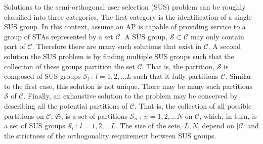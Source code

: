 Solutions to the semi-orthogonal user selection (SUS) problem can be roughly classified into three categories. The first category is the identification of a single SUS group. In this context, assume an AP is capable of providing service to a group of STAs represented by a set $\mathcal{C}$. A SUS group, $\mathcal{S} \subset \mathcal{C}$ may only contain part of $\mathcal{C}$. Therefore there are many such solutions that exist in $\mathcal{C}$. A second solution the SUS problem is by finding multiple SUS groups such that the collection of these groups partition the set $\mathcal{C}$. That is, the partition, $\mathscr{S}$ is composed of SUS groups $\mathcal{S}_l\ :\ l = 1,2,\ldots L$ such that it fully partitions $\mathcal{C}$. Similar to the first case, this solution is not unique. There may be many such partitions $\mathscr{S}$ of $\mathcal{C}$. Finally, an exhaustive solution to the problem may be conceived by describing all the potential partitions of $\mathcal{C}$. That is, the collection of all possible partitions on $\mathcal{C}$, $\mathfrak{S}$, is a set of partitions $\mathscr{S}_n\ : \ n=1,2,\ldots N$ on $\mathcal{C}$, which, in turn, is a set of SUS groups $\mathcal{S}_l \ :\ l = 1,2,\ldots L$. The size of the sets, $L,N$, depend on $\vert \mathcal{C}\vert$ and the strictness of the orthogonality requirement between SUS groups.

